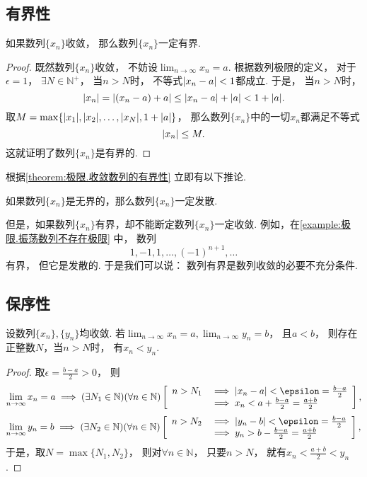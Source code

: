 \subsection{有界性}
\begin{theorem}[有界性]\label{theorem:极限.收敛数列的有界性}
如果数列\(\{x_n\}\)收敛，
那么数列\(\{x_n\}\)一定有界.
\begin{proof}
既然数列\(\{x_n\}\)收敛，
不妨设\(\lim_{n\to\infty} x_n = a\).
根据数列极限的定义，
对于\(\epsilon = 1\)，
\(\exists N \in \mathbb{N}^+\)，
当\(n > N\)时，
不等式\(\abs{x_n - a} < 1\)都成立.
于是，
当\(n > N\)时，
\[
	\abs{x_n} = \abs{(x_n - a) + a} \leq \abs{x_n - a} + \abs{a} < 1 + \abs{a}.
\]
取\(M = \max\{\abs{x_1},\abs{x_2},\dotsc,\abs{x_N},1+\abs{a}\}\)，
那么数列\(\{x_n\}\)中的一切\(x_n\)都满足不等式\[
	\abs{x_n} \leq M.
\]
这就证明了数列\(\{x_n\}\)是有界的.
\end{proof}
\end{theorem}

根据\cref{theorem:极限.收敛数列的有界性} 立即有以下推论.
\begin{corollary}
如果数列\(\{x_n\}\)是无界的，那么数列\(\{x_n\}\)一定发散.
\end{corollary}
但是，如果数列\(\{x_n\}\)有界，却不能断定数列\(\{x_n\}\)一定收敛.
例如，在\cref{example:极限.振荡数列不存在极限} 中，
数列\[
	1,-1,1,\dotsc,(-1)^{n+1},\dotsc
\]有界，
但它是发散的.
于是我们可以说：
数列有界是数列收敛的必要不充分条件.

\subsection{保序性}
\begin{theorem}[保序性]\label{theorem:极限.收敛数列的保序性1}
设数列\(\{x_n\},\{y_n\}\)均收敛.
若\(\lim_{n\to\infty} x_n = a,
\lim_{n\to\infty} y_n = b\)，
且\(a < b\)，
则存在正整数\(N\)，当\(n>N\)时，
有\(x_n < y_n\).
\begin{proof}
取\(\epsilon=\frac{b-a}2>0\)，
则\[
	\lim_{n\to\infty} x_n = a
	\implies
	(\exists N_1\in\mathbb{N})(\forall n\in\mathbb{N})
	\left[
		\begin{array}{rl}
			n>N_1
			&\implies
			\abs{x_n - a} < \epsilon = \frac{b-a}2 \\
			&\implies
			x_n < a + \frac{b-a}2 = \frac{a+b}2
		\end{array}
	\right],
\]\[
	\lim_{n\to\infty} y_n = b
	\implies
	(\exists N_2\in\mathbb{N})(\forall n\in\mathbb{N})
	\left[
		\begin{array}{rl}
			n>N_2
			&\implies
			\abs{y_n - b} < \epsilon = \frac{b-a}2 \\
			&\implies
			y_n > b - \frac{b-a}2 = \frac{a+b}2
		\end{array}
	\right],
\]
于是，取\(N = \max\{N_1,N_2\}\)，
则对\(\forall n\in\mathbb{N}\)，
只要\(n>N\)，
就有\(x_n < \frac{a+b}2 < y_n\).
\end{proof}
\end{theorem}

